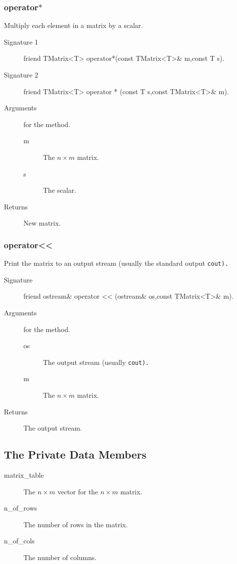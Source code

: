 \subsubsection{operator$*$}
Multiply each element in a matrix by a scalar.
\begin{description}
  \item[Signature 1] friend TMatrix<T> operator*(const TMatrix<T>\&
  m,const T s).
  \item[Signature 2] friend TMatrix<T> operator * (const T s,const
  TMatrix<T>\& m).
  \item[Arguments] for the method.
   \begin{description}
     \item [m] The $n \times m$ matrix.
     \item [s] The scalar.
   \end{description} 
  \item [Returns] New matrix.
\end{description}

\subsubsection{operator<<}
Print the matrix to an output stream (usually the standard output \tt cout\rm).

\begin{description}
  \item[Signature] friend ostream\& operator << (ostream\& os,const TMatrix<T>\& m).
  \item[Arguments] for the method.
   \begin{description}
     \item [os] The output stream (usually \tt cout\rm).
     \item [m] The $n \times m$ matrix.
   \end{description} 
  \item [Returns] The output stream.
\end{description}

\subsection{The Private Data Members}

\begin{description}
  \item [matrix\_table] The $n \times m$ vector for the  
                           $n \times m$ matrix.
  \item [n\_of\_rows] The number of rows in the matrix.
  \item [n\_of\_cols] The number of columns.
\end{description}

